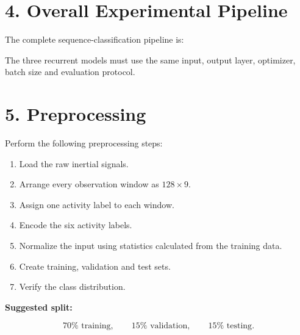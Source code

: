 \documentclass[10pt]{article}
\begin{document}
\section*{4. Overall Experimental Pipeline}

The complete sequence-classification pipeline is:

\begin{center}
\end{center}

The three recurrent models must use the same input, output layer, optimizer,
batch size and evaluation protocol.

\section*{5. Preprocessing}

Perform the following preprocessing steps:

\begin{enumerate}
\item Load the raw inertial signals.
\item Arrange every observation window as $128\times9$.
\item Assign one activity label to each window.
\item Encode the six activity labels.
\item Normalize the input using statistics calculated from the training data.
\item Create training, validation and test sets.
\item Verify the class distribution.
\end{enumerate}

\textbf{Suggested split:}

\[
70\% \text{ training},\qquad
15\% \text{ validation},\qquad
15\% \text{ testing}.
\]
\end{document}
